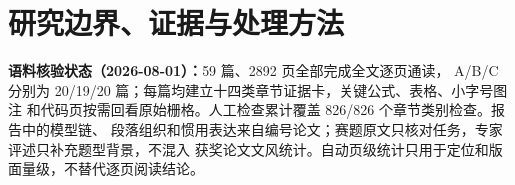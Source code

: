 \section{研究边界、证据与处理方法}

\noindent\textbf{语料核验状态（2026-08-01）：}59 篇、2892 页全部完成全文逐页通读，
A/B/C 分别为 20/19/20 篇；每篇均建立十四类章节证据卡，关键公式、表格、小字号图注
和代码页按需回看原始栅格。人工检查累计覆盖 826/826 个章节类别检查。报告中的模型链、
段落组织和惯用表达来自编号论文；赛题原文只核对任务，专家评述只补充题型背景，不混入
获奖论文文风统计。自动页级统计只用于定位和版面量级，不替代逐页阅读结论。

